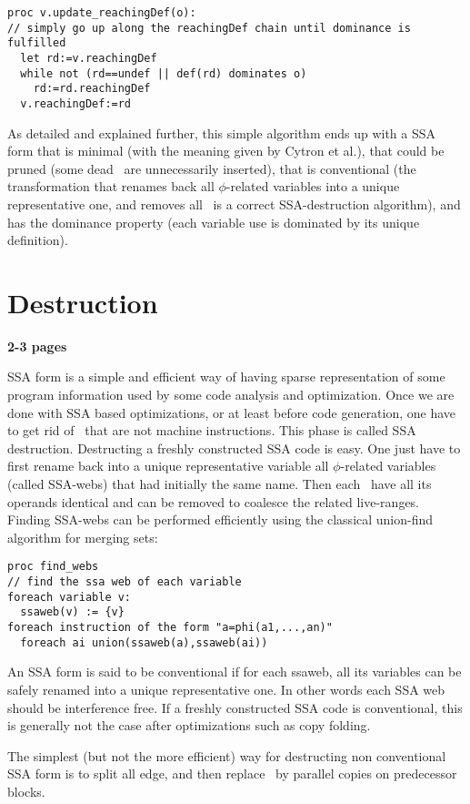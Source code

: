 \begin{verbatim}
proc v.update_reachingDef(o):
// simply go up along the reachingDef chain until dominance is fulfilled 
  let rd:=v.reachingDef
  while not (rd==undef || def(rd) dominates o)
    rd:=rd.reachingDef
  v.reachingDef:=rd
\end{verbatim}

As detailed and explained further, this simple algorithm ends up with a SSA form that is minimal (with the meaning given by Cytron et al.), that could be pruned (some dead \phiops\ are unnecessarily inserted), that is conventional (the transformation that renames back all $\phi$-related variables into a unique representative one, and removes all \phiops\ is a correct SSA-destruction algorithm), and has the dominance property (each variable use is dominated by its unique definition).
\section{Destruction }
\label{sec:classical_destruction}
\textbf{2-3 pages}

SSA form is a simple and efficient way of having sparse representation of some program information used by some code analysis and optimization. Once we are done with SSA based optimizations, or at least before code generation, one have to get rid of \phiops\ that are not machine instructions. This phase is called SSA destruction. 
Destructing a freshly constructed SSA code is easy. One just have to first rename back into a unique representative variable all $\phi$-related variables (called SSA-webs) that had initially the same name. Then each \phiop\ have all its operands identical and can be removed to coalesce the related live-ranges.
Finding SSA-webs can be performed efficiently using the classical union-find algorithm for merging sets:
\begin{verbatim}
proc find_webs
// find the ssa web of each variable
foreach variable v:
  ssaweb(v) := {v}
foreach instruction of the form "a=phi(a1,...,an)"
  foreach ai union(ssaweb(a),ssaweb(ai))
\end{verbatim}

An SSA form is said to be conventional if for each ssaweb, all its variables can be safely renamed into a unique representative one. In other words each SSA web should be interference free. If a freshly constructed SSA code is conventional, this is generally not the case after optimizations such as copy folding.

The simplest (but not the more efficient) way for destructing non conventional SSA form is to split all edge, and then replace \phiops\ by parallel copies on predecessor blocks. 

